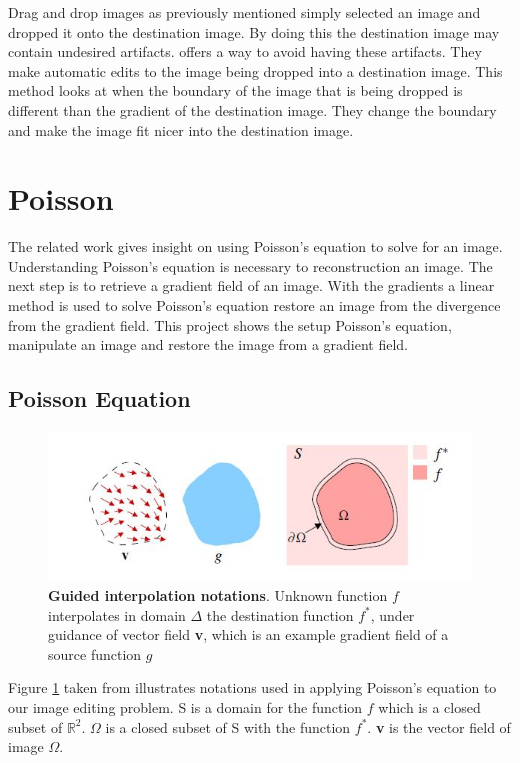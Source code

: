 \documentclass[10pt,twopage]{acmsiggraph}
\begin{document}
Drag and drop images as previously mentioned simply selected an image and dropped it onto the destination image. By doing this the destination image may contain undesired artifacts. \cite{ddp} offers a way to avoid having these artifacts. They make automatic edits to the image being dropped into a destination image. This method looks at when the boundary of the image that is being dropped is different than the gradient of the destination image. They change the boundary and make the image fit nicer into the destination image.

\section{Poisson}

The related work gives insight on using Poisson's equation to solve for an image. Understanding Poisson's equation is necessary to reconstruction an image. The next step is to retrieve a gradient field of an image. With the gradients a linear method is used to solve Poisson's equation restore an image from the divergence from the gradient field. This project shows the setup Poisson's equation, manipulate an image and restore the image from a gradient field.

\subsection{Poisson Equation}
\label{Poisson}

\begin{figure}
\centering
\includegraphics[width=.44\textwidth]{fig/notations.jpg}
\caption{{\bf Guided interpolation notations}. Unknown function $f$ interpolates in domain \ensuremath{\Delta} the destination function $f^*$, under guidance of vector field {\bf v}, which is an example gradient field of a source function $g$}
\label{notations}
\end{figure}

Figure \ref{notations} taken from \cite{Perez} illustrates notations used in applying Poisson's equation to our image editing problem. S is a domain  for the function $f$ which is a closed subset of  \ensuremath{\mathbb{R}^2}. \ensuremath{\Omega} is a closed subset of S with the function $f^*$. {\bf v} is the vector field of image  \ensuremath{\Omega}. 
\end{document}
